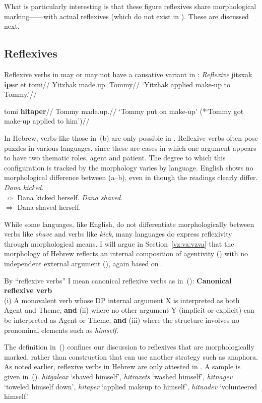 What is particularly interesting is that these figure reflexives share morphological marking---\thit---with actual reflexives (which do not exist in {\tnif}). These are discussed next.

	\subsection{Reflexives} \label{vz:thit:refl}
Reflexive verbs in {\thit} may or may not have a causative variant in {\tpie}:
\pex\label{ex:vz:refl-va}\textit{Reflexive}
	\a \begingl
		\gla jitsxak \textbf{iper} et tomi//
		\glb Yitzhak made.up.  Tommy//
		\glft `Yitzhak applied make-up to Tommy.'//
	\endgl
	
	\a \begingl
		\gla tomi \textbf{hitaper}//
		\glb Tommy made.up.//
		\glft `Tommy put on make-up' (*`Tommy got make-up applied to him')//
	\endgl
\xe

In Hebrew, verbs like those in~(\lastx b) are only possible in {\thit}. Reflexive verbs often pose puzzles in various languages, since these are cases in which one argument appears to have two thematic roles, agent and patient. The degree to which this configuration is tracked by the morphology varies by language. English shows no morphological difference between (\nextx a--b), even in though the readings clearly differ.
\pex \a \emph{Dana kicked.}\\
		$\nRightarrow$ Dana kicked herself.
	\a \emph{Dana shaved}.\\
		$\Rightarrow$ Dana shaved herself.
\xe

While some languages, like English, do not differentiate morphologically between verbs like \emph{shave} and verbs like \emph{kick}, many languages do express reflexivity through morphological means. I will argue in Section~\ref{vz:va:vzva} that the morphology of Hebrew reflects an internal composition of agentivity (\va) with no independent external argument (\vz), again based on \cite{kastner17gjgl}.

By ``reflexive verbs'' I mean canonical reflexive verbs as in~(\nextx):
\ex \textbf{Canonical reflexive verb}\\
	(i) A monovalent verb whose DP internal argument X is interpreted as both Agent and Theme, \textbf{and} (ii) where no other argument Y (implicit or explicit) can be interpreted as Agent or Theme, \textbf{and} (iii) where the structure involves no pronominal elements such as \emph{himself}.
\xe

The definition in~(\lastx) confines our discussion to reflexives that are morphologically marked, rather than construction that can use another strategy such as anaphora. As noted earlier, reflexive verbs in Hebrew are only attested in \thit. A sample is given in~(\nextx).
\ex\label{ex:refl}\emph{hitgaleax} `shaved himself', \emph{hitraxets} `washed himself', \emph{hitnagev} `toweled himself down', \emph{hitaper} `applied makeup to himself', \emph{hitnadev} `volunteered himself'.
\xe

